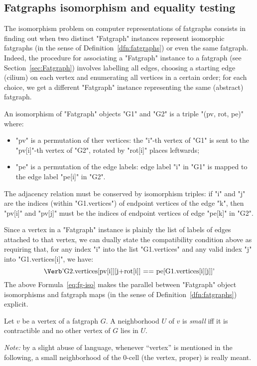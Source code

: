 \subsection{Fatgraphs isomorphism and equality testing}
\label{sec:isomorphism}

The isomorphism problem on computer representations of fatgraphs
consists in finding out when two distinct "Fatgraph" instances
represent isomorphic fatgraphs (in the sense of
Definition~\ref{dfn:fatgraphs}) or even the same fatgraph.  Indeed,
the procedure for associating a "Fatgraph" instance to a fatgraph (see
Section~\ref{sec:Fatgraph}) involves labelling all edges, choosing a
starting edge (cilium) on each vertex and enumerating all vertices in
a certain order; for each choice, we get a different "Fatgraph"
instance representing the same (abstract) fatgraph.

\begin{definition}
  An isomorphism of "Fatgraph" objects "G1" and "G2" is a triple 
  "(pv, rot, pe)" where:
  \begin{itemize}
  \item "pv" is a permutation of ther vertices: the "i"-th vertex of
    "G1" is sent to the "pv[i]"-th vertex of "G2", rotated by "rot[i]"
    places leftwards;
  \item "pe" is a permutation of the edge labels: edge label "i" in
    "G1" is mapped to the edge label "pe[i]" in "G2".
  \end{itemize}
  The adjacency relation must be conserved by isomorphism triples: if
  "i" and "j" are the indices (within "G1.vertices") of endpoint
  vertices of the edge "k", then "pv[i]" and "pv[j]" must be the
  indices of endpoint vertices of edge "pe[k]" in "G2".
\end{definition}
Since a vertex in a "Fatgraph" instance is plainly the list of labels
of edges attached to that vertex, we can dually state the
compatibility condition above as requiring that, for any index "i"
into the list "G1.vertices" and any valid index "j" into
"G1.vertices[i]", we have:
\begin{equation}
  \label{eq:fg-iso}
  \text{\protect\Verb'G2.vertices[pv[i]][j+rot[i]] == pe[G1.vertices[i][j]]'}
\end{equation}
The above Formula~\eqref{eq:fg-iso} makes the parallel between "Fatgraph" object
isomorphisms and fatgraph maps (in the sense of
Definition~\ref{dfn:fatgraphs}) explicit.

\begin{definition}
  Let $v$ be a vertex of a fatgraph $G$.  A neighborhood $U$ of $v$ is
  \emph{small} iff it is contractible and no other vertex of $G$ lies
  in $U$.
\end{definition}
\emph{Note:} by a slight abuse of language, whenever ``vertex'' is
mentioned in the following, a small neighborhood of the 0-cell (the
vertex, proper) is really meant.

